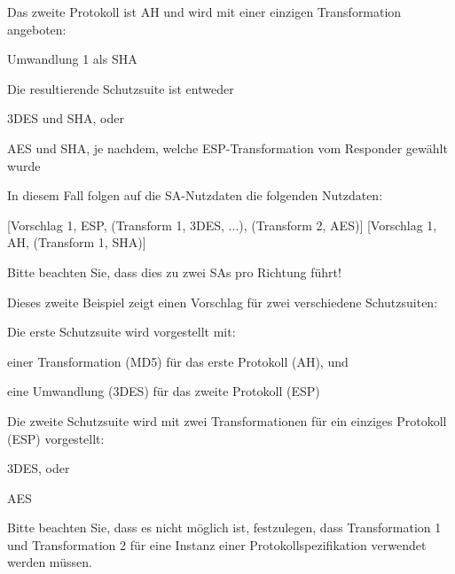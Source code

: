 \documentclass[a4paper]{article}
\begin{document}
\begin{multicols}{3}
\begin{itemize*}
\begin{itemize*}
\begin{itemize*}
                        \item Das zweite Protokoll ist AH und wird mit einer einzigen Transformation angeboten:
                        \begin{itemize*} \item Umwandlung 1 als SHA \end{itemize*}
                        \item Die resultierende Schutzsuite ist entweder
                        \begin{itemize*} \item 3DES und SHA, oder \item AES und SHA, je nachdem, welche ESP-Transformation vom Responder gewählt wurde \end{itemize*}
                        \item In diesem Fall folgen auf die SA-Nutzdaten die folgenden Nutzdaten:
                        \begin{itemize*} \item {[}Vorschlag 1, ESP, (Transform 1, 3DES, ...), (Transform 2, AES){]} {[}Vorschlag 1, AH, (Transform 1, SHA){]} \end{itemize*}
                        \item Bitte beachten Sie, dass dies zu zwei SAs pro Richtung führt!
                  \end{itemize*}
                  \item       Dieses zweite Beispiel zeigt einen Vorschlag für zwei verschiedene
                  Schutzsuiten:
                  \begin{itemize*}
                        \item Die erste Schutzsuite wird vorgestellt mit:
                        \begin{itemize*} \item einer Transformation (MD5) für das erste Protokoll (AH), und \item eine Umwandlung (3DES) für das zweite Protokoll (ESP) \end{itemize*}
                        \item Die zweite Schutzsuite wird mit zwei Transformationen für ein einziges Protokoll (ESP) vorgestellt:
                        \begin{itemize*} \item 3DES, oder \item AES \end{itemize*}
                        \item Bitte beachten Sie, dass es nicht möglich ist, festzulegen, dass Transformation 1 und Transformation 2 für eine Instanz einer Protokollspezifikation verwendet werden müssen.

\end{itemize*}
\end{itemize*}
\end{itemize*}
\end{multicols}
\end{document}
